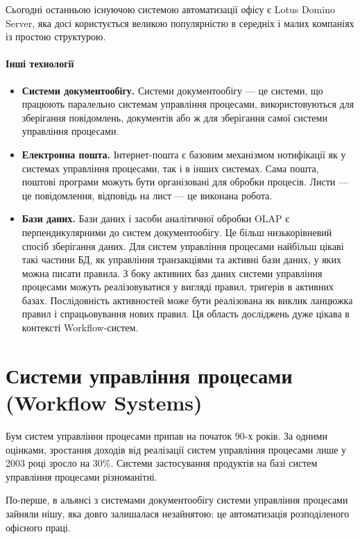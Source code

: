 \documentclass{memoir}
\begin{document}
Сьогодні останньою існуючою системою автоматизації офісу є Lotus Domino Server, яка досі користується великою популярністю в середніх і малих компаніях із простою структурою.

\paragraph{Інші технології}

\begin{itemize}
    \item \textbf{Системи документообігу.} Системи документообігу — це системи, що працюють паралельно системам управління процесами, використовуються для зберігання повідомлень, документів або ж для зберігання самої системи управління процесами.
    \item \textbf{Електронна пошта.} Інтернет-пошта є базовим механізмом нотифікації як у системах управління процесами, так і в інших системах. Сама пошта, поштові програми можуть бути організовані для обробки процесів. Листи — це повідомлення, відповідь на лист — це виконана робота.
    \item \textbf{Бази даних.} Бази даних і засоби аналітичної обробки OLAP є перпендикулярними до систем документообігу. Це більш низькорівневий спосіб зберігання даних. Для систем управління процесами найбільш цікаві такі частини БД, як управління транзакціями та активні бази даних, у яких можна писати правила. З боку активних баз даних системи управління процесами можуть реалізовуватися у вигляді правил, тригерів в активних базах. Послідовність активностей може бути реалізована як виклик ланцюжка правил і спрацьовування нових правил. Ця область досліджень дуже цікава в контексті Workflow-систем.
\end{itemize}

\section{Системи управління процесами (Workflow Systems)}

Бум систем управління процесами припав на початок 90-х років. За одними оцінками, зростання доходів від реалізації систем управління процесами лише у 2003 році зросло на 30\%. Системи застосування продуктів на базі систем управління процесами різноманітні.

По-перше, в альянсі з системами документообігу системи управління процесами зайняли нішу, яка довго залишалася незайнятою: це автоматизація розподіленого офісного праці.
\end{document}

